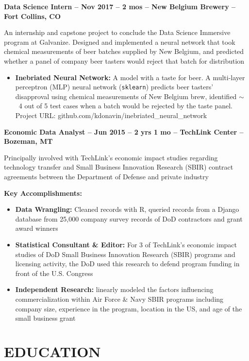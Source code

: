 \documentclass[resmargin, centered, 10pt]{res}
\def \fullwidth{\textwidth}
\newcommand{\tab}[1][1cm]{\hspace*{#1}}
\newcommand{\loose}{\vspace{0.5cm}}
\newcommand{\subtext}[1]{\tab[0.5cm] \parbox{\dimexpr\fullwidth-0.5cm\relax}{#1}}
\begin{document}
\begin{resume}
\textbf{Data Science Intern --  Nov 2017 -- 2 mos -- New Belgium Brewery -- Fort Collins, CO}

\subtext{An internship and capstone project to conclude the Data Science Immersive program at Galvanize. Designed and implemented a neural network that took chemical measurements of beer batches supplied by New Belgium, and predicted whether a panel of company beer tasters would reject that batch for distribution}

\begin{itemize}
	\item \textbf{Inebriated Neural Network:} A model with a taste for beer. A multi-layer perceptron (MLP) neural network (\texttt{sklearn}) predicts beer tasters’ disapproval using chemical measurements of New Belgium brew, identified $\sim$\hspace{-1mm}~4 out of 5 test cases when a batch would be rejected by the taste panel. Project URL: github.com/kdonavin/inebriated\_neural\_network
\end{itemize}

\textbf{Economic Data Analyst -- Jun 2015 -- 2 yrs 1 mo -- TechLink Center -- Bozeman, MT}

\subtext{
	Principally involved with TechLink's economic impact studies regarding technology transfer and Small Business Innovation Research (SBIR) contract agreements between the Department of Defense and private industry
}

\subtext{\textbf{Key Accomplishments:}}
	
\begin{itemize}
	\item \textbf{Data Wrangling:} Cleaned records with R, queried records from a Django database from 25,000 company survey records of DoD contractors and grant award winners
	\item \textbf{Statistical Consultant \& Editor:} For 3 of TechLink’s economic impact studies of DoD Small Business Innovation Research (SBIR) programs and licensing activity, the DoD used this research to defend program funding in front of the U.S. Congress
	\item \textbf{Independent Research:} linearly modeled the factors influencing commercialization within Air Force \& Navy SBIR programs including company size, experience in the program, location in the US, and age of the small business grant
\end{itemize} 

\loose
\fullline
\section{EDUCATION}


\end{resume}
\end{document}
